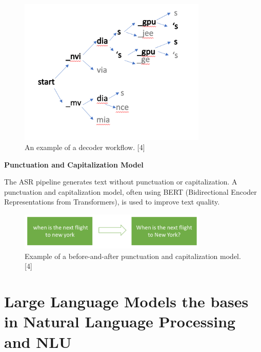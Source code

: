 \begin{figure}[ht]
    \centering
    \includegraphics[width=0.8\textwidth]{Figure2.4.png}
    \caption{An example of a decoder workflow. [4]}
    \label{fig:decoder-workflow}
\end{figure}

\textbf{Punctuation and Capitalization Model}

The ASR pipeline generates text without punctuation or capitalization. A punctuation and capitalization model, often using BERT (Bidirectional Encoder Representations from Transformers), is used to improve text quality.

\begin{figure}[h]
    \centering
    \includegraphics[width=0.8\textwidth]{Figure2.5.png}
    \caption{Example of a before-and-after punctuation and capitalization model. [4]}
    \label{fig:punctuation-model}
\end{figure}













    







\section*{Large Language Models the bases in Natural Language Processing and NLU}



